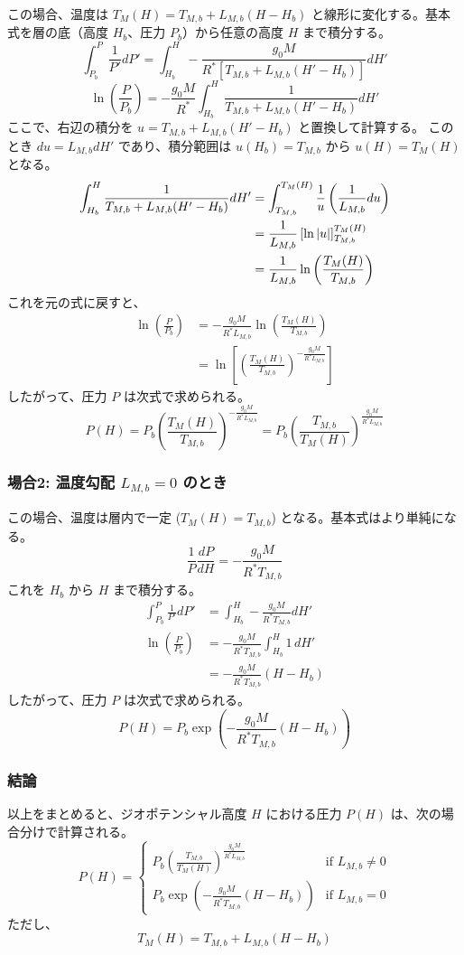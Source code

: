 \documentclass[a4paper,12pt]{article}
\begin{document}
この場合、温度は $T_M(H) = T_{M,b} + L_{M,b}(H - H_b)$ と線形に変化する。基本式を層の底（高度 $H_b$、圧力 $P_b$）から任意の高度 $H$ まで積分する。
\[
\int_{P_b}^{P} \frac{1}{P'} dP' = \int_{H_b}^{H} -\frac{g_0 M}{R^* \left[ T_{M,b} + L_{M,b}(H' - H_b) \right]} dH'
\]
\[
\ln\left(\frac{P}{P_b}\right) = - \frac{g_0 M}{R^*} \int_{H_b}^{H} \frac{1}{T_{M,b} + L_{M,b}(H' - H_b)} dH'
\]
ここで、右辺の積分を $u = T_{M,b} + L_{M,b}(H' - H_b)$ と置換して計算する。
このとき $du = L_{M,b} dH'$ であり、積分範囲は $u(H_b) = T_{M,b}$ から $u(H) = T_M(H)$ となる。
\begin{align*}
\int_{H_b}^{H} \frac{1}{T_{M,b} + L_{M,b}(H' - H_b)} dH' &= \int_{T_{M,b}}^{T_M(H)} \frac{1}{u} \left(\frac{1}{L_{M,b}} du\right) \\
&= \frac{1}{L_{M,b}} \left[ \ln\abs{u} \right]_{T_{M,b}}^{T_M(H)} \\
&= \frac{1}{L_{M,b}} \ln\left( \frac{T_M(H)}{T_{M,b}} \right)
\end{align*}
これを元の式に戻すと、
\begin{align*}
\ln\left(\frac{P}{P_b}\right) &= - \frac{g_0 M}{R^* L_{M,b}} \ln\left(\frac{T_M(H)}{T_{M,b}}\right) \\
&= \ln\left[ \left(\frac{T_M(H)}{T_{M,b}}\right)^{-\frac{g_0 M}{R^* L_{M,b}}} \right]
\end{align*}
したがって、圧力 $P$ は次式で求められる。
\[
P(H) = P_b \left( \frac{T_M(H)}{T_{M,b}} \right)^{-\frac{g_0 M}{R^* L_{M,b}}} = P_b \left( \frac{T_{M,b}}{T_M(H)} \right)^{\frac{g_0 M}{R^* L_{M,b}}}
\]

\subsubsection*{場合2: 温度勾配 $L_{M,b} = 0$ のとき}
この場合、温度は層内で一定 ($T_M(H) = T_{M,b}$) となる。基本式はより単純になる。
\[
\frac{1}{P}\frac{dP}{dH} = -\frac{g_0 M}{R^* T_{M,b}}
\]
これを $H_b$ から $H$ まで積分する。
\begin{align*}
\int_{P_b}^{P} \frac{1}{P'} dP' &= \int_{H_b}^{H} -\frac{g_0 M}{R^* T_{M,b}} dH' \\
\ln\left(\frac{P}{P_b}\right) &= -\frac{g_0 M}{R^* T_{M,b}} \int_{H_b}^{H} 1 \, dH' \\
&= -\frac{g_0 M}{R^* T_{M,b}} (H - H_b)
\end{align*}
したがって、圧力 $P$ は次式で求められる。
\[
P(H) = P_b \exp\left(-\frac{g_0 M}{R^* T_{M,b}} (H-H_b)\right)
\]

\subsubsection*{結論}
以上をまとめると、ジオポテンシャル高度 $H$ における圧力 $P(H)$ は、次の場合分けで計算される。
\[
P(H) =
\begin{cases}
  P_b \left( \frac{T_{M,b}}{T_M(H)} \right)^{\frac{g_0 M}{R^*L_{M,b}}} & \text{if } L_{M,b} \neq 0 \\
  P_b \exp \left( -\frac{g_0 M}{R^*T_{M,b}}(H-H_b) \right) & \text{if } L_{M,b} = 0
\end{cases}
\]
ただし、
\[
T_M(H) = T_{M,b} + L_{M,b}(H - H_b)
\]
\end{document}
